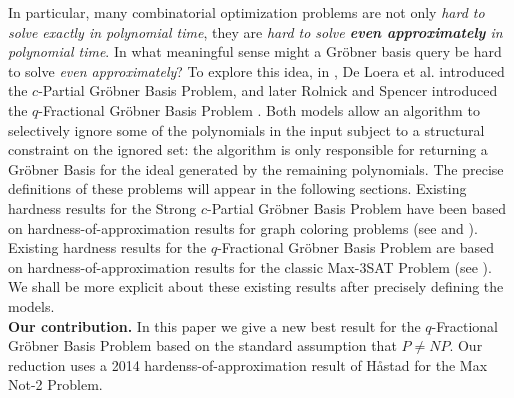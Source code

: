 \documentclass{article}
\begin{document}
In particular, many combinatorial optimization problems are not only \textit{hard to solve exactly in polynomial time}, they are \textit{hard to solve \textbf{even approximately} in polynomial time}. In what meaningful sense might a Gr\"{o}bner basis query be hard to solve \textit{even approximately}? To explore this idea, in \cite{deloera}, De Loera et al. introduced the $c$-Partial Gr\"{o}bner Basis Problem, and later Rolnick and Spencer introduced the $q$-Fractional Gr\"{o}bner Basis Problem \cite{RS}. Both models allow an algorithm to selectively ignore some of the polynomials in the input subject to a structural constraint on the ignored set: the algorithm is only responsible for returning a Gr\"{o}bner Basis for the ideal generated by  the remaining polynomials. The precise definitions of these problems will appear in the following sections. Existing hardness results for the Strong $c$-Partial Gr\"{o}bner Basis Problem have been based on hardness-of-approximation results for graph coloring problems (see \citep{deloera} and \citep{RS}). Existing hardness results for the $q$-Fractional Gr\"{o}bner Basis Problem are based on hardness-of-approximation results for the classic Max-3SAT Problem (see \citep{RS}). We shall be more explicit about these existing results after precisely defining the models.\\







 



\noindent \textbf{Our contribution.} 
In this paper we give a new best result for the $q$-Fractional Gr\"{o}bner Basis Problem based on the standard assumption that $P\neq NP$. Our reduction uses a 2014 hardenss-of-approximation result of H{\aa}stad for the Max Not-2 Problem.
\end{document}
